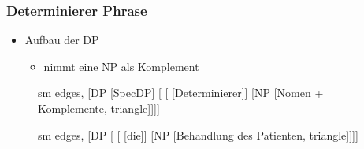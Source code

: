 \begin{frame}
\frametitle{Determinierer Phrase}

	\begin{itemize}
		\item Aufbau der DP
		\begin{itemize}
			\item {} nimmt eine NP als Komplement
		\end{itemize}
	\end{itemize}


\begin{figure}[b]
  	\begin{minipage}[b]{0.45\textwidth}
	\centering
	\footnotesize{
		\begin{forest}
		sm edges,
		[DP [SpecDP]
			[ 	[ [Determinierer]]
						[NP [Nomen + Komplemente, triangle]]]]
		\end{forest}
		}
  	\end{minipage}  
	\begin{minipage}[b]{0.45\textwidth}
	\centering
	\footnotesize{
		\begin{forest}
		sm edges,
		[DP [ 	[ [die]]
						[NP [Behandlung des Patienten, triangle]]]]
		\end{forest}
		}
  	\end{minipage}  
\end{figure}

\end{frame}


